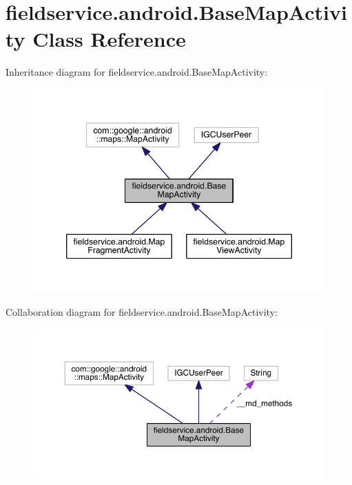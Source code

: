 \hypertarget{classfieldservice_1_1android_1_1_base_map_activity}{\section{fieldservice.\+android.\+Base\+Map\+Activity Class Reference}
\label{classfieldservice_1_1android_1_1_base_map_activity}
}


Inheritance diagram for fieldservice.\+android.\+Base\+Map\+Activity\+:
\nopagebreak
\begin{figure}[H]
\begin{center}
\leavevmode
\includegraphics[width=346pt]{classfieldservice_1_1android_1_1_base_map_activity__inherit__graph}
\end{center}
\end{figure}


Collaboration diagram for fieldservice.\+android.\+Base\+Map\+Activity\+:
\nopagebreak
\begin{figure}[H]
\begin{center}
\leavevmode
\includegraphics[width=350pt]{classfieldservice_1_1android_1_1_base_map_activity__coll__graph}
\end{center}
\end{figure}
